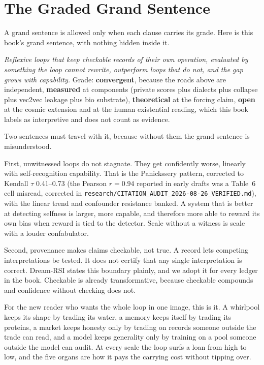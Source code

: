 \section{The Graded Grand Sentence}
\label{sec:ch10-sentence}

A grand sentence is allowed only when each clause carries its grade. Here is this book's grand sentence, with nothing hidden inside it.

\textit{Reflexive loops that keep checkable records of their own operation, evaluated by something the loop cannot rewrite, outperform loops that do not, and the gap grows with capability.} Grade: \textbf{convergent}, because the roads above are independent, \textbf{measured} at components (private scores plus dialects plus collapse plus vec2vec leakage plus bio substrate), \textbf{theoretical} at the forcing claim, \textbf{open} at the cosmic extension and at the human existential reading, which this book labels as interpretive and does not count as evidence.

Two sentences must travel with it, because without them the grand sentence is misunderstood.

First, unwitnessed loops do not stagnate. They get confidently worse, linearly with self-recognition capability. That is the Panickssery pattern, corrected to Kendall $\tau$ 0.41--0.73 \cite{panickssery2024} (the Pearson $r=0.94$ reported in early drafts was a Table~6 cell misread, corrected in \texttt{research/CITATION\_AUDIT\_2026-08-26\_VERIFIED.md}), with the linear trend and confounder resistance banked. A system that is better at detecting selfness is larger, more capable, and therefore more able to reward its own bias when reward is tied to the detector. Scale without a witness is scale with a louder confabulator.

Second, provenance makes claims checkable, not true. A record lets competing interpretations be tested. It does not certify that any single interpretation is correct. Dream-RSI states this boundary plainly, and we adopt it for every ledger in the book. Checkable is already transformative, because checkable compounds and confidence without checking does not.

For the new reader who wants the whole loop in one image, this is it. A whirlpool keeps its shape by trading its water, a memory keeps itself by trading its proteins, a market keeps honesty only by trading on records someone outside the trade can read, and a model keeps generality only by training on a pool someone outside the model can audit. At every scale the loop surfs a loan from high to low, and the five organs are how it pays the carrying cost without tipping over.

